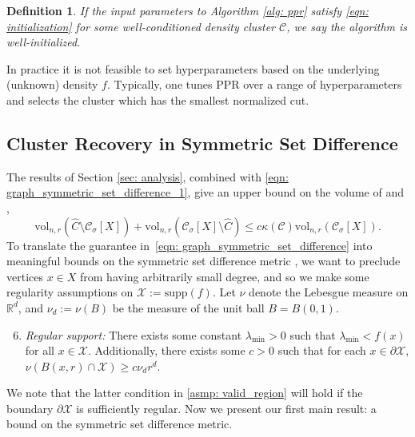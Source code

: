 \documentclass[11pt,twoside]{article}
\newtheorem{definition}{Definition}
\newcommand{\vol}{\mathrm{vol}}
\newcommand{\Reals}{\mathbb{R}}
\newcommand{\Rd}{\Reals^d}
\newcommand{\1}{\mathbf{1}}
\newcommand{\Xbf}{X}             %
\newcommand{\Cset}{\mathcal{C}}
\newcommand{\Csig}{\Cset_{\sigma}}
\newcommand{\Cest}{\widehat{C}}
\begin{document}
\begin{definition}
If the input parameters to Algorithm \ref{alg: ppr} satisfy \eqref{eqn:
  initialization} for some well-conditioned density cluster $\Cset$, we
say the algorithm is \emph{well-initialized}. 
\end{definition}
\noindent In practice it is  not feasible to set hyperparameters based on the
underlying (unknown) density $f$. Typically, one tunes PPR over a range of
hyperparameters and selects the cluster which has the smallest normalized cut. 

\subsection{Cluster Recovery in Symmetric Set Difference}
The results of Section \ref{sec: analysis}, combined 
with \eqref{eqn: graph_symmetric_set_difference_1}, give an upper bound on the
volume of \smash{$\Cest \setminus \Csig[\Xbf]$} and \smash{$\Csig[\Xbf]
  \setminus \Cest$},  
\begin{equation}
\label{eqn: graph_symmetric_set_difference}
\vol_{n,r}(\Cest \setminus \Csig[\Xbf]) + \vol_{n,r}(\Csig[\Xbf] \setminus
\Cest) \leq c \kappa(\Cset) \vol_{n,r}(\Csig[\Xbf]). 
\end{equation}
To translate the guarantee in~\eqref{eqn: graph_symmetric_set_difference} into meaningful bounds
on the symmetric set difference metric \smash{$\Delta(\Csig[\Xbf], \Cest)$}, we
want to preclude vertices $x \in \Xbf$ from having arbitrarily small degree, and
so we make some regularity assumptions on $\mathcal{X} := \mathrm{supp}(f)$. Let
$\nu$ denote the Lebesgue measure on $\Rd$, and $\nu_d := \nu(B)$ be the measure
of the unit ball $B = B(0,1)$. 
\begin{enumerate}[label=(A\arabic*)]
  \setcounter{enumi}{5}
\item 
  \label{asmp: valid_region}
  \emph{Regular support:} There exists some constant $\lambda_{\min} > 0$ such 
  that $\lambda_{\min} < f(x)$ for all $x \in \mathcal{X}$. Additionally, there
  exists some $c > 0$ such that for each $x \in \partial \mathcal{X}$,
  $\nu(B(x,r) \cap \mathcal{X}) \geq c \nu_d r^d$. 
\end{enumerate}
We note that the latter condition in \ref{asmp: valid_region} will hold if the
boundary $\partial \mathcal{X}$ is sufficiently regular.  Now we present our
first main result: a bound on the symmetric set difference metric.
\end{document}
